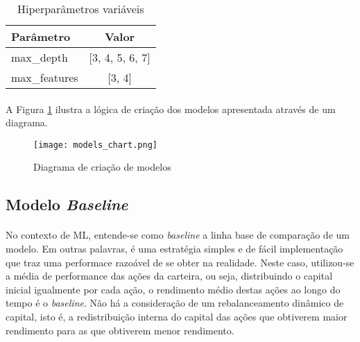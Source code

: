 \begin{table}[!htb]
    \begin{center}
        \begin{tabular}{ l|c }
            Parâmetro & Valor \\
            \hline
            max\_depth & [3, 4, 5, 6, 7] \\
            max\_features & [3, 4] \\
        \end{tabular}
        \caption{Hiperparâmetros variáveis}
        \label{tab:16}
    \end{center}
\end{table}

\paragraph{} A Figura \ref{fig:580} ilustra a lógica de criação dos modelos apresentada através de um diagrama.

\begin{figure}[!htb]
    \texttt{[image: models\_chart.png]}
    \centering
    \caption{Diagrama de criação de modelos}
    \label{fig:580}
\end{figure}




\FloatBarrier
\subsection{Modelo \textit{Baseline}}
\label{sub:baseline}

\paragraph{} No contexto de ML, entende-se como \textit{baseline} a linha base de comparação de um modelo. Em outras palavras, é uma estratégia simples e de fácil implementação que traz uma performace razoável de se obter na realidade. Neste caso, utilizou-se a média de performance das ações da carteira, ou seja, distribuindo o capital inicial igualmente por cada ação, o rendimento médio destas ações ao longo do tempo é o \textit{baseline}. Não há a consideração de um rebalanceamento dinâmico de capital, isto é, a redistribuição interna do capital das ações que obtiverem maior rendimento para as que obtiverem menor rendimento.


